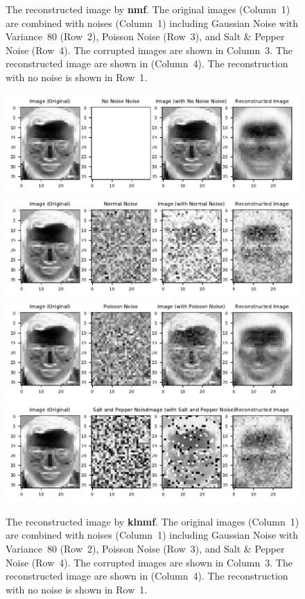\begin{figure}
	\caption{The reconstructed image by \textbf{nmf}. The original images (Column~1) are combined with noises (Column~1) including Gaussian Noise with Variance~$80$ (Row~2), Poisson Noise (Row~3), and Salt \& Pepper Noise (Row~4). The corrupted images are shown in Column~3. The reconstructed image are shown in (Column~4). The reconstruction with no noise is shown in Row~1.}\label{noisesnmff}
\end{figure}
\begin{figure}
	\centering
	\includegraphics[scale=.9]{Result_Multiplication_KL_Divergence_No_Noise_Comparison}\\
	\includegraphics[scale=.9]{Result_Multiplication_KL_Divergence_Normal_Comparison}\\
	\includegraphics[scale=.9]{Result_Multiplication_KL_Divergence_Poisson_Comparison}\\
	\includegraphics[scale=.9]{Result_Multiplication_KL_Divergence_Salt_and_Pepper_Comparison}
\caption{The reconstructed image by \textbf{klnmf}. The original images (Column~1) are combined with noises (Column~1) including Gaussian Noise with Variance~$80$ (Row~2), Poisson Noise (Row~3), and Salt \& Pepper Noise (Row~4). The corrupted images are shown in Column~3. The reconstructed image are shown in (Column~4). The reconstruction with no noise is shown in Row~1.}\label{noisesklnmff}
\end{figure}
